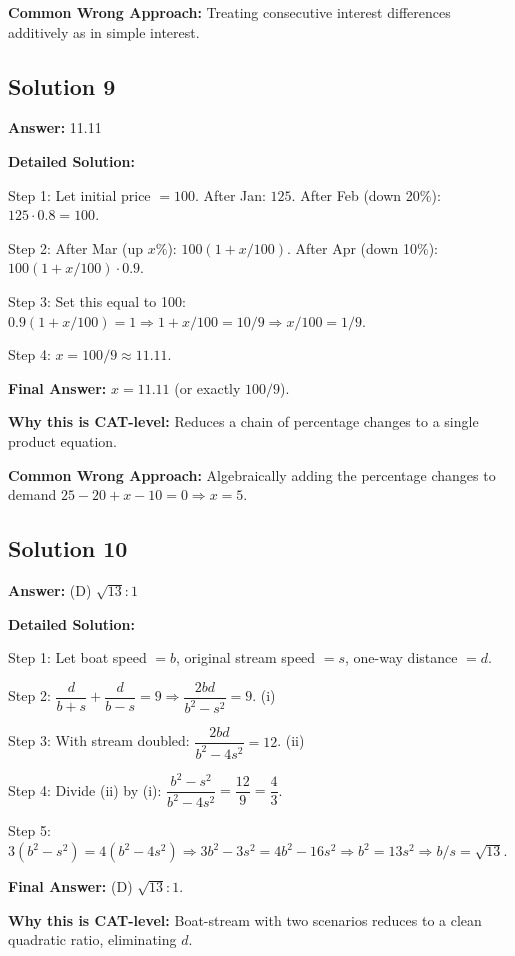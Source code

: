 \documentclass[11pt]{article}
\begin{document}
\textbf{Common Wrong Approach:} Treating consecutive interest differences additively as in simple interest.

\subsection*{Solution 9}
\textbf{Answer:} 11.11

\textbf{Detailed Solution:}

Step 1: Let initial price $= 100$. After Jan: $125$. After Feb (down 20\%): $125 \cdot 0.8 = 100$.

Step 2: After Mar (up $x\%$): $100(1 + x/100)$. After Apr (down 10\%): $100(1 + x/100) \cdot 0.9$.

Step 3: Set this equal to 100: $0.9(1 + x/100) = 1 \Rightarrow 1 + x/100 = 10/9 \Rightarrow x/100 = 1/9$.

Step 4: $x = 100/9 \approx 11.11$.

\textbf{Final Answer:} $x = 11.11$ (or exactly $100/9$).

\textbf{Why this is CAT-level:} Reduces a chain of percentage changes to a single product equation.

\textbf{Common Wrong Approach:} Algebraically adding the percentage changes to demand $25 - 20 + x - 10 = 0 \Rightarrow x = 5$.

\subsection*{Solution 10}
\textbf{Answer:} (D) $\sqrt{13}:1$

\textbf{Detailed Solution:}

Step 1: Let boat speed $= b$, original stream speed $= s$, one-way distance $= d$.

Step 2: $\dfrac{d}{b+s} + \dfrac{d}{b-s} = 9 \Rightarrow \dfrac{2bd}{b^2 - s^2} = 9$. \quad (i)

Step 3: With stream doubled: $\dfrac{2bd}{b^2 - 4s^2} = 12$. \quad (ii)

Step 4: Divide (ii) by (i): $\dfrac{b^2 - s^2}{b^2 - 4s^2} = \dfrac{12}{9} = \dfrac{4}{3}$.

Step 5: $3(b^2 - s^2) = 4(b^2 - 4s^2) \Rightarrow 3b^2 - 3s^2 = 4b^2 - 16s^2 \Rightarrow b^2 = 13 s^2 \Rightarrow b/s = \sqrt{13}$.

\textbf{Final Answer:} (D) $\sqrt{13}:1$.

\textbf{Why this is CAT-level:} Boat-stream with two scenarios reduces to a clean quadratic ratio, eliminating $d$.
\end{document}

